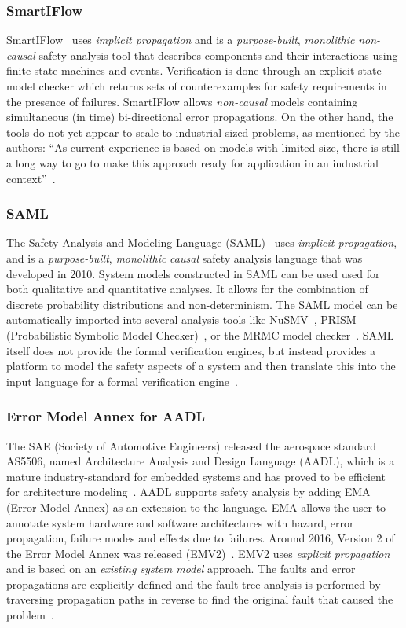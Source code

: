 \subsubsection{SmartIFlow}
SmartIFlow~\cite{info17:HaLuHo,honig2014new} uses {\em implicit propagation} and is a {\em purpose-built}, {\em monolithic} {\em non-causal} safety analysis tool that describes components and their interactions using finite state machines and events. Verification is done through an explicit state model checker which returns sets of counterexamples for safety requirements in the presence of failures.  SmartIFlow allows {\em non-causal} models containing simultaneous (in time) bi-directional error propagations.  On the other hand, the tools do not yet appear to scale to industrial-sized problems, as mentioned by the authors: ``As current experience is based on models with limited size, there is still a long way to go to make this approach ready for application in an industrial context''~\cite{info17:HaLuHo}.

\subsubsection{SAML}
The Safety Analysis and Modeling Language (SAML)~\cite{Gudemann:2010:FQQ:1909626.1909813} uses {\em implicit propagation}, and is a {\em purpose-built}, {\em monolithic} {\em causal} safety analysis language that was developed in 2010.  System models constructed in SAML can be used used for both qualitative and quantitative analyses. It allows for the combination of discrete probability distributions and non-determinism. The SAML model can be automatically imported into several analysis tools like NuSMV~\cite{Cimatti2000}, PRISM (Probabilistic Symbolic Model Checker)~\cite{CAV2011:KwNoPa}, or the MRMC model checker~\cite{Katoen:2005:MRM:1114692.1115230}. SAML itself does not provide the formal verification engines, but instead provides a platform to model the safety aspects of a system and then translate this into the input language for a formal verification engine~\cite{Gudemann:2010:FQQ:1909626.1909813}.

\subsubsection{Error Model Annex for AADL}
The SAE (Society of Automotive Engineers) released the
aerospace standard AS5506, named Architecture Analysis and Design Language (AADL), which is a mature industry-standard for embedded systems and has proved to be efficient for architecture modeling~\cite{aerospace2012sae,liu2016research}. AADL supports safety analysis by adding EMA (Error Model Annex) as an extension to the language. EMA allows the user to annotate system hardware and software architectures with hazard, error propagation, failure modes and effects due to failures. Around 2016, Version 2 of the Error Model Annex was released (EMV2)~\cite{EMV2}. EMV2 uses {\em explicit propagation} and is based on an {\em existing system model} approach. The faults and error propagations are explicitly defined and the fault tree analysis is performed by traversing propagation paths in reverse to find the original fault that caused the problem~\cite{feiler2017automated}. 


